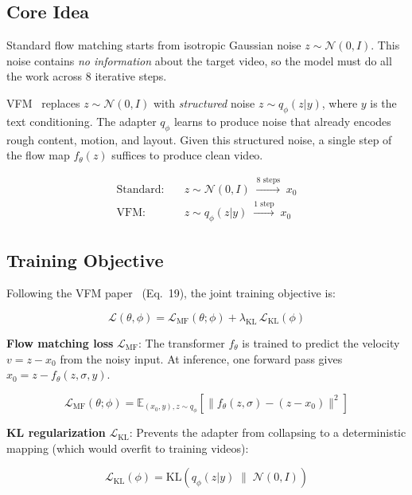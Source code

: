 \documentclass[10pt,twocolumn]{article}
\begin{document}
\subsection{Core Idea}

Standard flow matching starts from isotropic Gaussian noise $z \sim \mathcal{N}(0,I)$. This noise contains \emph{no information} about the target video, so the model must do all the work across 8 iterative steps.

VFM~\cite{vfm} replaces $z \sim \mathcal{N}(0,I)$ with \emph{structured} noise $z \sim q_\phi(z | y)$, where $y$ is the text conditioning. The adapter $q_\phi$ learns to produce noise that already encodes rough content, motion, and layout. Given this structured noise, a single step of the flow map $f_\theta(z)$ suffices to produce clean video.

\begin{align}
  \text{Standard:}& \quad z \sim \mathcal{N}(0,I) \;\xrightarrow{\text{8 steps}}\; x_0 \\
  \text{VFM:}& \quad z \sim q_\phi(z|y) \;\xrightarrow{\text{1 step}}\; x_0
\end{align}

\subsection{Training Objective}

Following the VFM paper~\cite{vfm} (Eq.~19), the joint training objective is:

\begin{equation}
  \mathcal{L}(\theta, \phi) = \mathcal{L}_{\text{MF}}(\theta;\phi) + \lambda_{\text{KL}}\,\mathcal{L}_{\text{KL}}(\phi)
\end{equation}

\textbf{Flow matching loss} $\mathcal{L}_{\text{MF}}$: The transformer $f_\theta$ is trained to predict the velocity $v = z - x_0$ from the noisy input. At inference, one forward pass gives $\hat{x}_0 = z - f_\theta(z, \sigma, y)$.

\begin{equation}
  \mathcal{L}_{\text{MF}}(\theta;\phi) = \mathbb{E}_{(x_0,y), z \sim q_\phi}\left[\|f_\theta(z,\sigma) - (z - x_0)\|^2\right]
\end{equation}

\textbf{KL regularization} $\mathcal{L}_{\text{KL}}$: Prevents the adapter from collapsing to a deterministic mapping (which would overfit to training videos):

\begin{equation}
  \mathcal{L}_{\text{KL}}(\phi) = \mathrm{KL}\!\left(q_\phi(z|y) \;\|\; \mathcal{N}(0,I)\right)
\end{equation}
\end{document}
